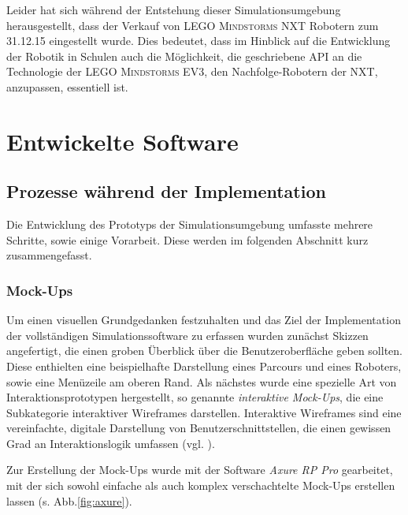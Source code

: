 \documentclass[paper=a4, DIV=calc, BCOR=15mm, twoside=on, onecolumn=on, open = right, titlepage =on, parskip =half, headsepline = on, footsepline = on, chapterprefix = off, appendixprefix = off, fontsize = 12pt, numbers = noenddot, abstract = on]{scrbook}
\begin{document}
Leider hat sich während der Entstehung dieser Simulationsumgebung herausgestellt, dass der Verkauf von \textsc{LEGO Mindstorms} NXT Robotern zum 31.12.15 eingestellt wurde. Dies bedeutet, dass im Hinblick auf die Entwicklung der Robotik in Schulen auch die Möglichkeit, die geschriebene API an die Technologie der \textsc{LEGO Mindstorms} EV3, den Nachfolge-Robotern der NXT, anzupassen, essentiell ist.


\par \singlespacing
\chapter{Entwickelte Software}
\onehalfspacing
\par \singlespacing
\section{Prozesse während der Implementation}
\onehalfspacing
Die Entwicklung des Prototyps der Simulationsumgebung umfasste mehrere Schritte, sowie einige Vorarbeit. Diese werden im folgenden Abschnitt kurz zusammengefasst.
\par \singlespacing
\subsection{Mock-Ups} 
\onehalfspacing
Um einen visuellen Grundgedanken festzuhalten und das Ziel der Implementation der vollständigen Simulationssoftware zu erfassen wurden zunächst Skizzen angefertigt, die einen groben Überblick über die Benutzeroberfläche geben sollten. Diese enthielten eine beispielhafte Darstellung eines Parcours und eines Roboters, sowie eine Menüzeile am oberen Rand. Als nächstes wurde eine spezielle Art von Interaktionsprototypen hergestellt, so genannte \emph{interaktive Mock-Ups}, die eine Subkategorie interaktiver Wireframes darstellen. Interaktive Wireframes sind eine vereinfachte, digitale Darstellung von Benutzerschnittstellen, die einen gewissen Grad an Interaktionslogik umfassen (vgl. \cite[S.162ff.]{moser:12}).

Zur Erstellung der Mock-Ups wurde mit der Software \emph{Axure RP Pro} gearbeitet, mit der sich sowohl einfache als auch komplex verschachtelte Mock-Ups erstellen lassen (s. Abb.\ref{fig:axure}).
\end{document}
